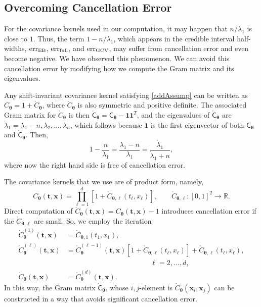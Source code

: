 \documentclass[twocolumn]{svjour3}          %
\newcommand{\bm}[1]{\boldsymbol{#1}}
\newcommand{\reals}{\mathbb{R}}
\newcommand{\rC}{\mathring{C}}
\newcommand{\rlambda}{\mathring{\lambda}}
\newcommand{\vtheta}{{\bm{\theta}}}
\newcommand{\vt}{\bm{t}}
\newcommand{\vx}{\bm{x}}
\newcommand{\vone}{\bm{1}}
\newcommand{\mC}{\mathsf{C}}
\newcommand{\rmC}{\mathring{\mathsf{C}}}
\newcommand{\MLE}{\textup{EB}}
\newcommand{\err}{\textup{err}}
\begin{document}
\subsection{Overcoming Cancellation Error}
For the covariance kernels used in our computation, it may happen that $n/\lambda_1$ is close to $1$.  Thus, the term $1-n/\lambda_1$, which appears in the credible interval half-widths, $\err_{\MLE}$, $\err_{\textup{full}}$, and $\err_{\textup{GCV}}$, may suffer from cancellation error and even become negative.  We have observed this phenomenon.  We can avoid this cancellation error by modifying how we compute the Gram matrix and its eigenvalues.

Any shift-invariant covariance kernel satisfying \eqref{addAssump} can be written as $C_\vtheta = 1 + \rC_\vtheta$, where $\rC_\vtheta$ is also symmetric and positive definite. The associated Gram matrix for $\rC_\vtheta$ is then $\rmC_\vtheta = \mC_\vtheta - \vone \vone^T$, and the eigenvalues of $\rmC_\vtheta$ are $\rlambda_1 = \lambda_1 - n, \lambda_2, \ldots, \lambda_n$, which follows because $\vone$ is the first eigenvector of both $\mC_\vtheta$ and $\rmC_\vtheta$. Then, 
\begin{equation*}
1 - \frac{n}{\lambda_1}  = \frac{\lambda_1 - n}{\lambda_1} = \frac{\rlambda_1}{\rlambda_1 +n},
\end{equation*}
where now the right hand side is free of cancellation error.

The covariance kernels that we use are of product form, namely,
\begin{equation*}
C_\vtheta(\vt, \vx) = \prod_{\ell=1}^d \left[1 + \rC_{\vtheta,\ell}(t_\ell,x_\ell) \right], \qquad  \rC_{\vtheta,\ell}:[0,1]^2 \to \reals.
\end{equation*}
Direct computation of $\rC_\vtheta(\vt,\vx) = C_\vtheta(\vt,\vx) -1$ introduces cancellation error if the $ \rC_{\vtheta, \ell}$ are small.  So, we employ the iteration
\begin{align*}
\rC^{(1)}_\vtheta(\vt,\vx) &= \rC_{\vtheta, 1}(t_1,x_1),  \\
\rC^{(\ell)}_\vtheta(\vt,\vx) &  = \rC^{(\ell-1)}_\vtheta(\vt,\vx) [1 + \rC_{\vtheta,\ell}(t_\ell,x_\ell)] + \rC_{\vtheta,\ell}(t_\ell,x_\ell), \\
& \hspace{5cm} \ell = 2, \ldots, d, \\
\rC_\vtheta(\vt,\vx)  & = \rC^{(d)}_\vtheta(\vt,\vx).
\end{align*}
In this way, the Gram matrix $\rmC_\vtheta$, whose $i,j$-element is $\rC_\vtheta(\vx_i,\vx_j)$ can be constructed in a way that avoids significant cancellation error.
\end{document}
